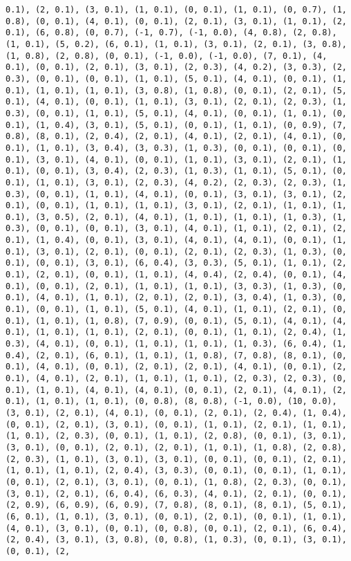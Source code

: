 \documentclass[11pt]{article}
\begin{document}
\begin{Verbatim}[commandchars=\\\{\}]
0.1), (2, 0.1), (3, 0.1), (1, 0.1), (0, 0.1), (1, 0.1), (0, 0.7), (1, 0.8), (0, 0.1), (4, 0.1), (0, 0.1), (2, 0.1), (3, 0.1), (1, 0.1), (2, 0.1), (6, 0.8), (0, 0.7), (-1, 0.7), (-1, 0.0), (4, 0.8), (2, 0.8), (1, 0.1), (5, 0.2), (6, 0.1), (1, 0.1), (3, 0.1), (2, 0.1), (3, 0.8), (1, 0.8), (2, 0.8), (0, 0.1), (-1, 0.0), (-1, 0.0), (7, 0.1), (4, 0.1), (0, 0.1), (2, 0.1), (3, 0.1), (2, 0.3), (4, 0.2), (3, 0.3), (2, 0.3), (0, 0.1), (0, 0.1), (1, 0.1), (5, 0.1), (4, 0.1), (0, 0.1), (1, 0.1), (1, 0.1), (1, 0.1), (3, 0.8), (1, 0.8), (0, 0.1), (2, 0.1), (5, 0.1), (4, 0.1), (0, 0.1), (1, 0.1), (3, 0.1), (2, 0.1), (2, 0.3), (1, 0.3), (0, 0.1), (1, 0.1), (5, 0.1), (4, 0.1), (0, 0.1), (1, 0.1), (0, 0.1), (1, 0.4), (3, 0.1), (5, 0.1), (0, 0.1), (1, 0.1), (0, 0.9), (7, 0.8), (8, 0.1), (2, 0.4), (2, 0.1), (4, 0.1), (2, 0.1), (4, 0.1), (0, 0.1), (1, 0.1), (3, 0.4), (3, 0.3), (1, 0.3), (0, 0.1), (0, 0.1), (0, 0.1), (3, 0.1), (4, 0.1), (0, 0.1), (1, 0.1), (3, 0.1), (2, 0.1), (1, 0.1), (0, 0.1), (3, 0.4), (2, 0.3), (1, 0.3), (1, 0.1), (5, 0.1), (0, 0.1), (1, 0.1), (3, 0.1), (2, 0.3), (4, 0.2), (2, 0.3), (2, 0.3), (1, 0.3), (0, 0.1), (1, 0.1), (4, 0.1), (0, 0.1), (3, 0.1), (3, 0.1), (2, 0.1), (0, 0.1), (1, 0.1), (1, 0.1), (3, 0.1), (2, 0.1), (1, 0.1), (1, 0.1), (3, 0.5), (2, 0.1), (4, 0.1), (1, 0.1), (1, 0.1), (1, 0.3), (1, 0.3), (0, 0.1), (0, 0.1), (3, 0.1), (4, 0.1), (1, 0.1), (2, 0.1), (2, 0.1), (1, 0.4), (0, 0.1), (3, 0.1), (4, 0.1), (4, 0.1), (0, 0.1), (1, 0.1), (3, 0.1), (2, 0.1), (0, 0.1), (2, 0.1), (2, 0.3), (1, 0.3), (0, 0.1), (0, 0.1), (3, 0.1), (6, 0.4), (3, 0.3), (5, 0.1), (1, 0.1), (2, 0.1), (2, 0.1), (0, 0.1), (1, 0.1), (4, 0.4), (2, 0.4), (0, 0.1), (4, 0.1), (0, 0.1), (2, 0.1), (1, 0.1), (1, 0.1), (3, 0.3), (1, 0.3), (0, 0.1), (4, 0.1), (1, 0.1), (2, 0.1), (2, 0.1), (3, 0.4), (1, 0.3), (0, 0.1), (0, 0.1), (1, 0.1), (5, 0.1), (4, 0.1), (1, 0.1), (2, 0.1), (0, 0.1), (1, 0.1), (1, 0.8), (7, 0.9), (0, 0.1), (5, 0.1), (4, 0.1), (4, 0.1), (1, 0.1), (1, 0.1), (2, 0.1), (0, 0.1), (1, 0.1), (2, 0.4), (1, 0.3), (4, 0.1), (0, 0.1), (1, 0.1), (1, 0.1), (1, 0.3), (6, 0.4), (1, 0.4), (2, 0.1), (6, 0.1), (1, 0.1), (1, 0.8), (7, 0.8), (8, 0.1), (0, 0.1), (4, 0.1), (0, 0.1), (2, 0.1), (2, 0.1), (4, 0.1), (0, 0.1), (2, 0.1), (4, 0.1), (2, 0.1), (1, 0.1), (1, 0.1), (2, 0.3), (2, 0.3), (0, 0.1), (1, 0.1), (4, 0.1), (4, 0.1), (0, 0.1), (2, 0.1), (4, 0.1), (2, 0.1), (1, 0.1), (1, 0.1), (0, 0.8), (8, 0.8), (-1, 0.0), (10, 0.0), (3, 0.1), (2, 0.1), (4, 0.1), (0, 0.1), (2, 0.1), (2, 0.4), (1, 0.4), (0, 0.1), (2, 0.1), (3, 0.1), (0, 0.1), (1, 0.1), (2, 0.1), (1, 0.1), (1, 0.1), (2, 0.3), (0, 0.1), (1, 0.1), (2, 0.8), (0, 0.1), (3, 0.1), (3, 0.1), (0, 0.1), (2, 0.1), (2, 0.1), (1, 0.1), (1, 0.8), (2, 0.8), (2, 0.3), (1, 0.1), (3, 0.1), (3, 0.1), (0, 0.1), (0, 0.1), (2, 0.1), (1, 0.1), (1, 0.1), (2, 0.4), (3, 0.3), (0, 0.1), (0, 0.1), (1, 0.1), (0, 0.1), (2, 0.1), (3, 0.1), (0, 0.1), (1, 0.8), (2, 0.3), (0, 0.1), (3, 0.1), (2, 0.1), (6, 0.4), (6, 0.3), (4, 0.1), (2, 0.1), (0, 0.1), (2, 0.9), (6, 0.9), (6, 0.9), (7, 0.8), (8, 0.1), (8, 0.1), (5, 0.1), (6, 0.1), (1, 0.1), (3, 0.1), (0, 0.1), (2, 0.1), (0, 0.1), (1, 0.1), (4, 0.1), (3, 0.1), (0, 0.1), (0, 0.8), (0, 0.1), (2, 0.1), (6, 0.4), (2, 0.4), (3, 0.1), (3, 0.8), (0, 0.8), (1, 0.3), (0, 0.1), (3, 0.1), (0, 0.1), (2, 
\end{Verbatim}
\end{document}
